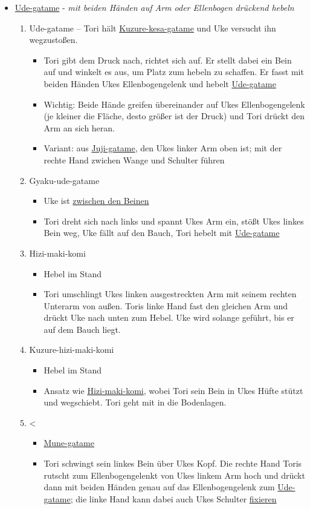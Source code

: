 \documentclass[justified, a4paper, notitlepage, captions=tableheading, nobib]{tufte-handout}
\begin{document}
\begin{itemize}
\item \hyperref[org7d0d631]{Ude-gatame} - \emph{mit beiden Händen auf Arm oder Ellenbogen drückend hebeln}

\begin{enumerate}
\item \label{org7d0d631}Ude-gatame
– Tori hält \hyperref[org9725a6e]{Kuzure-kesa-gatame} und Uke versucht ihn wegzustoßen. 
\begin{itemize}
\item Tori gibt dem Druck nach, richtet sich auf. Er stellt dabei ein Bein auf und winkelt es aus, um Platz zum hebeln zu schaffen. Er fasst mit beiden Händen Ukes Ellenbogengelenk und hebelt \hyperref[org7d0d631]{Ude-gatame}
\item Wichtig: Beide Hände greifen übereinander auf Ukes Ellenbogengelenk (je kleiner die Fläche, desto größer ist der Druck) und Tori drückt den Arm an sich heran.
\item Variant: aus \hyperref[orgd926b87]{Juji-gatame}, den Ukes linker Arm oben ist; mit der rechte Hand zwichen Wange und Schulter führen
\end{itemize}
\item \label{orga693d82}Gyaku-ude-gatame
\begin{itemize}
\item Uke ist \hyperref[org9bede9d]{zwischen den Beinen}
\item Tori dreht sich nach links und spannt Ukes Arm ein, stößt Ukes linkes Bein weg, Uke fällt auf den Bauch, Tori hebelt mit \hyperref[org7d0d631]{Ude-gatame}
\end{itemize}
\item \label{org1a5f96a}Hizi-maki-komi 
\begin{itemize}
\item Hebel im Stand
\item Tori umschlingt Ukes linken ausgestreckten Arm mit seinem rechten Unterarm von außen. Toris linke Hand fast den gleichen Arm und drückt Uke nach unten zum Hebel. Uke wird solange geführt, bis er auf dem Bauch liegt.
\end{itemize}
\item \label{orge302d54}Kuzure-hizi-maki-komi 
\begin{itemize}
\item Hebel im Stand
\item Ansatz wie \hyperref[org1a5f96a]{Hizi-maki-komi}, wobei Tori sein Bein in Ukes Hüfte stützt und wegschiebt. Tori geht mit in die Bodenlagen.
\end{itemize}
\item <\label{orgdc1273a} 
\begin{itemize}
\item \hyperref[org97af0c8]{Mune-gatame}
\item Tori schwingt sein linkes Bein über Ukes Kopf. Die rechte Hand Toris rutscht zum Ellenbogengelenkt von Ukes linkem Arm hoch und drückt dann mit beiden Händen genau auf das Ellenbogengelenk zum \hyperref[org7d0d631]{Ude-gatame}; die linke Hand kann dabei auch Ukes Schulter \hyperref[org62822f6]{fixieren}
\end{itemize}
\end{enumerate}


\end{itemize}
\end{document}
